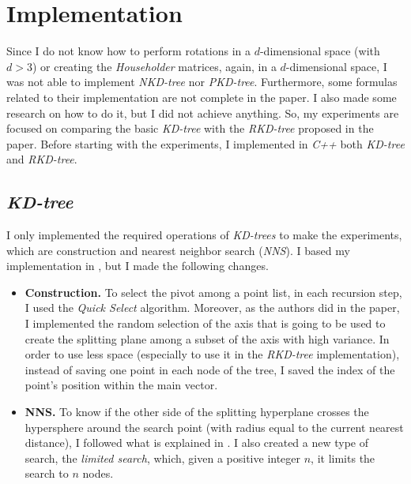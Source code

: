 \section{Implementation}

Since I do not know how to perform rotations in a $d$-dimensional space (with $d > 3$) or creating the \textit{Householder} matrices, again, in a $d$-dimensional space, I was not able to implement \textit{NKD-tree} nor \textit{PKD-tree}. Furthermore, some formulas related to their implementation are not complete in the paper. I also made some research on how to do it, but I did not achieve anything. So, my experiments are focused on comparing the basic \textit{KD-tree} with the \textit{RKD-tree} proposed in the paper. Before starting with the experiments, I implemented in \textit{C++} both \textit{KD-tree} and \textit{RKD-tree}.

\subsection{\textit{KD-tree}}
I only implemented the required operations of \textit{KD-trees} to make the experiments, which are construction and nearest neighbor search (\textit{NNS}). I based my implementation in \cite{wiki}, but I made the following changes.
\begin{itemize}
    \item \textbf{Construction.} To select the pivot among a point list, in each recursion step, I used the \textit{Quick Select} algorithm. Moreover, as the authors did in the paper, I implemented the random selection of the axis that is going to be used to create the splitting plane among a subset of the axis with high variance. In order to use less space (especially to use it in the \textit{RKD-tree} implementation), instead of saving one point in each node of the tree, I saved the index of the point's position within the main vector.
    \item \textbf{NNS.} To know if the other side of the splitting hyperplane crosses the hypersphere around the search point (with radius equal to the current nearest distance), I followed what is explained in \cite{nns}. I also created a new type of search, the \textit{limited search}, which, given a positive integer $n$, it limits the search to $n$ nodes.
\end{itemize}

